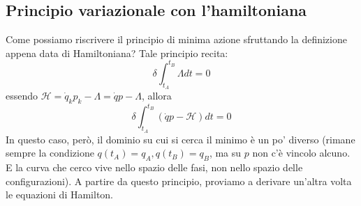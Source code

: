 \documentclass[a4paper,openany]{article}
\begin{document}
	\subsection{Principio variazionale con l'hamiltoniana}
	Come possiamo riscrivere il principio di minima azione sfruttando la definizione appena data di Hamiltoniana? Tale principio recita:
	\begin{equation}\label{key}
		\delta \int_{t_A}^{t_B} \Lambda dt = 0
	\end{equation}
	essendo $\mathcal{H} = \dot{q}_k p_k - \Lambda=\dot{q}p-\Lambda $, allora
	\begin{equation}\label{key}
		\delta \int_{t_A}^{t_B}(\dot{q} p-\mathcal{H}) dt = 0
	\end{equation}
	In questo caso, però, il dominio su cui si cerca il minimo è un po' diverso (rimane sempre la condizione $q(t_A)=q_A, q(t_B)=q_B$, ma su $p$ non c'è vincolo alcuno. E la curva che cerco vive nello spazio delle fasi, non nello spazio delle configurazioni). A partire da questo principio, proviamo a derivare un'altra volta le equazioni di Hamilton. 
	
\end{document}
